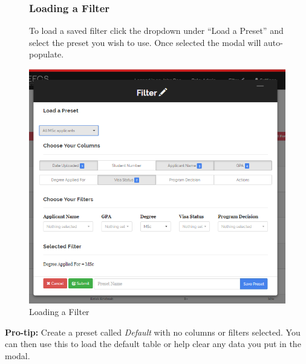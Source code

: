 \documentclass[fontsize=12pt,paper=letter,twoside]{scrartcl}
\begin{document}
\clearpage
\begin{figure}[!htb]
\subsubsection{Loading a Filter}
To load a saved filter click the dropdown under ``Load a Preset'' and select the preset you wish to use. Once selected the modal will auto-populate.

\begin{center}
\includegraphics[width=.99\textwidth]{images/ma/load_preset.png}
\end{center}
\caption{Loading a Filter}
\label{fig:save_filter}
\end{figure}

\smallskip
\noindent \textbf{Pro-tip:} Create a preset called \emph{Default} with no columns or filters selected. You can then use this to load the default table or help clear any data you put in the modal.

\clearpage
\end{document}
